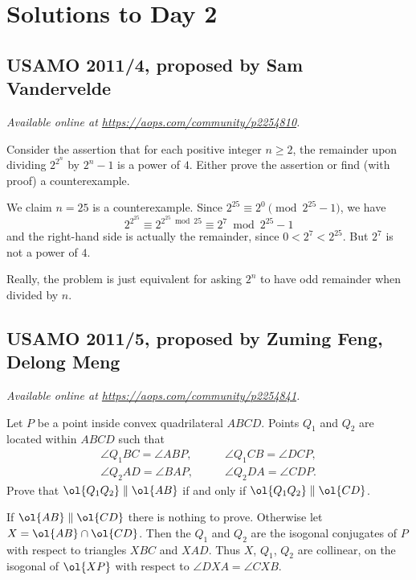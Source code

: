 \documentclass[11pt]{scrartcl}
\begin{document}
\section{Solutions to Day 2}
\subsection{USAMO 2011/4, proposed by Sam Vandervelde}
\textsl{Available online at \url{https://aops.com/community/p2254810}.}
\begin{mdframed}[style=mdpurplebox,frametitle={Problem statement}]
Consider the assertion that for each positive integer $n\geq2$,
the remainder upon dividing $2^{2^n}$ by $2^n-1$ is a power of $4$.
Either prove the assertion or find (with proof) a counterexample.
\end{mdframed}
We claim $n = 25$ is a counterexample.
Since $2^{25} \equiv 2^0 \pmod{2^{25}-1}$, we have
\[ 2^{2^{25}} \equiv 2^{2^{25} \bmod{25}}
  \equiv 2^7 \bmod{2^{25}-1} \]
and the right-hand side is actually the remainder,
since $0 < 2^7 < 2^{25}$.
But $2^7$ is not a power of $4$.

\begin{remark*}
  Really, the problem is just equivalent
  for asking $2^n$ to have odd remainder when divided by $n$.
\end{remark*}
\pagebreak

\subsection{USAMO 2011/5, proposed by Zuming Feng, Delong Meng}
\textsl{Available online at \url{https://aops.com/community/p2254841}.}
\begin{mdframed}[style=mdpurplebox,frametitle={Problem statement}]
Let $P$ be a point inside convex quadrilateral $ABCD$.
Points $Q_1$ and $Q_2$ are located within $ABCD$ such that
\begin{align*}
\angle Q_1BC=\angle ABP, & \qquad \angle Q_1CB=\angle DCP, \\
\angle Q_2AD=\angle BAP, & \qquad \angle Q_2DA=\angle CDP.
\end{align*}
Prove that $\ol{Q_1Q_2} \parallel \ol{AB}$
if and only if $\ol{Q_1Q_2} \parallel \ol{CD}$.
\end{mdframed}
If $\ol{AB} \parallel \ol{CD}$ there is nothing to prove.
Otherwise let $X = \ol{AB} \cap \ol{CD}$.
Then the $Q_1$ and $Q_2$ are the isogonal conjugates of $P$
with respect to triangles $XBC$ and $XAD$.
Thus $X$, $Q_1$, $Q_2$ are collinear,
on the isogonal of $\ol{XP}$ with respect to
$\angle DXA = \angle CXB$.
\pagebreak
\end{document}
